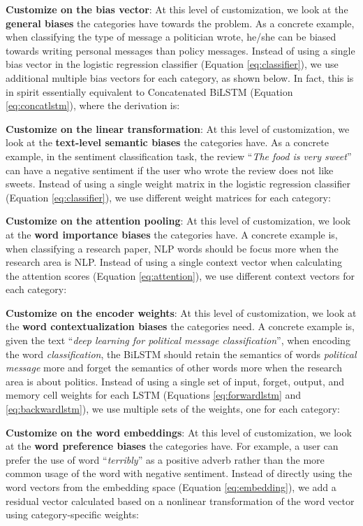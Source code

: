 \documentclass[11pt,a4paper]{article}
\begin{document}
\begin{enumerate}
{
\item{\textbf{Customize on the bias vector}}: At this level of customization, we look at the \textbf{general biases} the categories have towards the problem. As a concrete example, when classifying the type of message a politician wrote, he/she can be biased towards writing personal messages than policy messages. Instead of using a single bias vector  in the logistic regression classifier (Equation \ref{eq:classifier}), we use additional multiple bias vectors for each category, as shown below. In fact, this is in spirit essentially equivalent to Concatenated BiLSTM (Equation \ref{eq:concatlstm}), where the derivation is:

\item{\textbf{Customize on the linear transformation}}: At this level of customization, we look at the \textbf{text-level semantic biases} the categories have. As a concrete example, in the sentiment classification task, the review ``\textit{The food is very sweet}'' can have a negative sentiment if the user who wrote the review does not like sweets. Instead of using a single weight matrix  in the logistic regression classifier (Equation \ref{eq:classifier}), we use different weight matrices for each category:

\item{\textbf{Customize on the attention pooling}}: At this level of customization, we look at the \textbf{word importance biases} the categories have. A concrete example is, when classifying a research paper, NLP words should be focus more when the research area is NLP. Instead of using a single context vector  when calculating the attention scores  (Equation \ref{eq:attention}), we use different context vectors for each category:

\item{\textbf{Customize on the encoder weights}}: At this level of customization, we look at the \textbf{word contextualization biases} the categories need. A concrete example is, given the text ``\textit{deep learning for political message classification}'', when encoding the word \textit{classification}, the BiLSTM should retain the semantics of words \textit{political message} more and forget the semantics of other words more when the research area is about politics. Instead of using a single set of input, forget, output, and memory cell weights for each LSTM (Equations \ref{eq:forwardlstm} and \ref{eq:backwardlstm}), we use multiple sets of the weights, one for each category:

\item{\textbf{Customize on the word embeddings}}: At this level of customization, we look at the \textbf{word preference biases} the categories have. For example, a user can prefer the use of word ``\textit{terribly}'' as a positive adverb rather than the more common usage of the word with negative sentiment. Instead of directly using the word vectors from the embedding space  (Equation \ref{eq:embedding}), we add a residual vector calculated based on a nonlinear transformation of the word vector using category-specific weights:

}
\end{enumerate}
\end{document}
